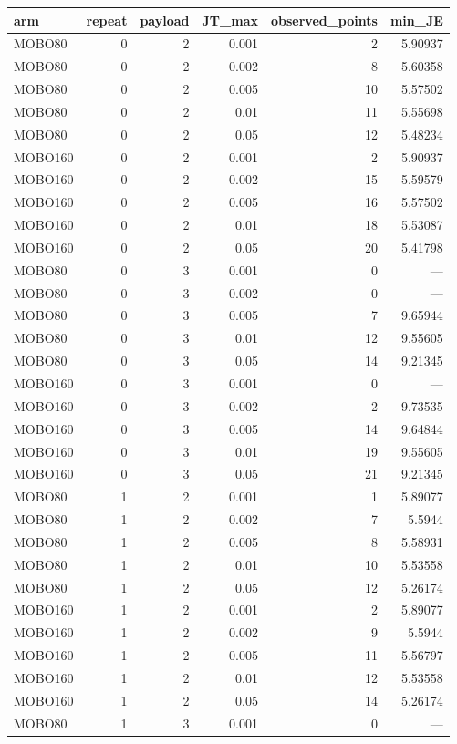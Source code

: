 \begin{tabular}{lrrrrr}
\toprule
arm & repeat & payload & JT\_max & observed\_points & min\_JE \\
\midrule
MOBO80 & 0 & 2 & 0.001 & 2 & 5.90937 \\
MOBO80 & 0 & 2 & 0.002 & 8 & 5.60358 \\
MOBO80 & 0 & 2 & 0.005 & 10 & 5.57502 \\
MOBO80 & 0 & 2 & 0.01 & 11 & 5.55698 \\
MOBO80 & 0 & 2 & 0.05 & 12 & 5.48234 \\
MOBO160 & 0 & 2 & 0.001 & 2 & 5.90937 \\
MOBO160 & 0 & 2 & 0.002 & 15 & 5.59579 \\
MOBO160 & 0 & 2 & 0.005 & 16 & 5.57502 \\
MOBO160 & 0 & 2 & 0.01 & 18 & 5.53087 \\
MOBO160 & 0 & 2 & 0.05 & 20 & 5.41798 \\
MOBO80 & 0 & 3 & 0.001 & 0 & — \\
MOBO80 & 0 & 3 & 0.002 & 0 & — \\
MOBO80 & 0 & 3 & 0.005 & 7 & 9.65944 \\
MOBO80 & 0 & 3 & 0.01 & 12 & 9.55605 \\
MOBO80 & 0 & 3 & 0.05 & 14 & 9.21345 \\
MOBO160 & 0 & 3 & 0.001 & 0 & — \\
MOBO160 & 0 & 3 & 0.002 & 2 & 9.73535 \\
MOBO160 & 0 & 3 & 0.005 & 14 & 9.64844 \\
MOBO160 & 0 & 3 & 0.01 & 19 & 9.55605 \\
MOBO160 & 0 & 3 & 0.05 & 21 & 9.21345 \\
MOBO80 & 1 & 2 & 0.001 & 1 & 5.89077 \\
MOBO80 & 1 & 2 & 0.002 & 7 & 5.5944 \\
MOBO80 & 1 & 2 & 0.005 & 8 & 5.58931 \\
MOBO80 & 1 & 2 & 0.01 & 10 & 5.53558 \\
MOBO80 & 1 & 2 & 0.05 & 12 & 5.26174 \\
MOBO160 & 1 & 2 & 0.001 & 2 & 5.89077 \\
MOBO160 & 1 & 2 & 0.002 & 9 & 5.5944 \\
MOBO160 & 1 & 2 & 0.005 & 11 & 5.56797 \\
MOBO160 & 1 & 2 & 0.01 & 12 & 5.53558 \\
MOBO160 & 1 & 2 & 0.05 & 14 & 5.26174 \\
MOBO80 & 1 & 3 & 0.001 & 0 & — \\

\end{tabular}
